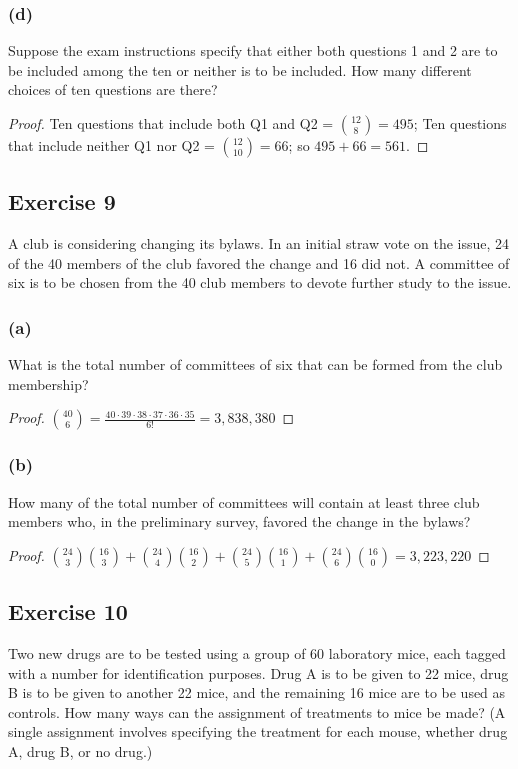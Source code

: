 \documentclass[14pt]{extarticle}
\begin{document}
\subsubsection{(d)}
Suppose the exam instructions specify that either both questions 1 and 2 are to be included among the ten or 
neither is to be included. How many different choices of ten questions are there?

\begin{proof}
Ten questions that include both Q1 and Q2 = \(\binom{12}{8} = 495\); Ten questions that include neither Q1 nor Q2 = 
\(\binom{12}{10} = 66\); so \(495 + 66 = 561\).
\end{proof}

\subsection{Exercise 9}
A club is considering changing its bylaws. In an initial straw vote on the issue, 24 of the 40 members of the club 
favored the change and 16 did not. A committee of six is to be chosen from the 40 club members to devote further study 
to the issue.

\subsubsection{(a)}
What is the total number of committees of six that can be formed from the club membership?

\begin{proof}
\(\binom{40}{6} = \frac{40 \cdot 39 \cdot 38 \cdot 37 \cdot 36 \cdot 35}{6!} = 3,838,380\)
\end{proof}

\subsubsection{(b)}
How many of the total number of committees will contain at least three club members who, in the preliminary survey, 
favored the change in the bylaws?

\begin{proof}
\(\binom{24}{3}\binom{16}{3} + \binom{24}{4}\binom{16}{2} + \binom{24}{5}\binom{16}{1} + \binom{24}{6}\binom{16}{0} = 
3,223,220\)
\end{proof}

\subsection{Exercise 10}
Two new drugs are to be tested using a group of 60 laboratory mice, each tagged with a number for identification purposes. 
Drug A is to be given to 22 mice, drug B is to be given to another 22 mice, and the remaining 16 mice are to be used as 
controls. How many ways can the assignment of treatments to mice be made? (A single assignment involves specifying the
treatment for each mouse, whether drug A, drug B, or no drug.)
\end{document}
